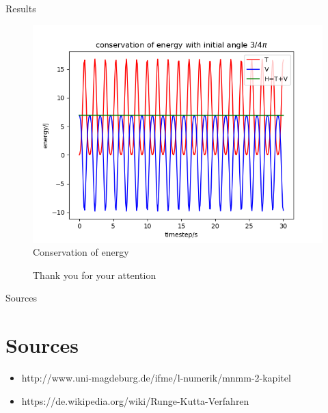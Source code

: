 \documentclass[9pt]{beamer}
\begin{document}
\begin{frame}{Results}
\begin{figure}
\centering
	\includegraphics[scale=0.5]{Figure_3.png}
	\caption{Conservation of energy}
\end{figure}

\end{frame}


\begin{frame}
\begin{figure}
\centering
	Thank you for your attention
\end{figure}

\end{frame}

\begin{frame}{Sources}
\section{Sources}
\begin{itemize}
\item http://www.uni-magdeburg.de/ifme/l-numerik/mnmm-2-kapitel%
\item https://de.wikipedia.org/wiki/Runge-Kutta-Verfahren
\end{itemize}


\end{frame}
\end{document}
